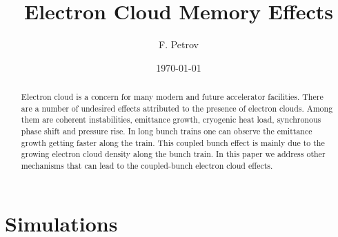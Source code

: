 \documentclass[5p]{elsarticle}%
\begin{document}
\title{Electron Cloud Memory Effects}
\author{F. Petrov}
\address[tudtemf]{Institut f\"ur Theorie Elektromagnetischer Felder (TEMF), Technische Universit\"{a}t Darmstadt,
Schlo{\ss}gartenstr. 8 64289 Darmstadt}
\date{\today}
\begin{abstract}
Electron cloud is a concern for many modern and future accelerator facilities. There are a number of undesired effects attributed to the presence of electron clouds. Among them are coherent instabilities, emittance growth, cryogenic heat load, synchronous phase shift and pressure rise. In long bunch trains one can observe the emittance growth getting faster along the train. This coupled bunch effect is mainly due to the growing electron cloud density along the bunch train. In this paper we address other mechanisms that can lead to the coupled-bunch electron cloud effects.
\end{abstract}


\maketitle

\section{Simulations}


\begin{thebibliography}{16}%


\end{thebibliography}%
\end{document}
